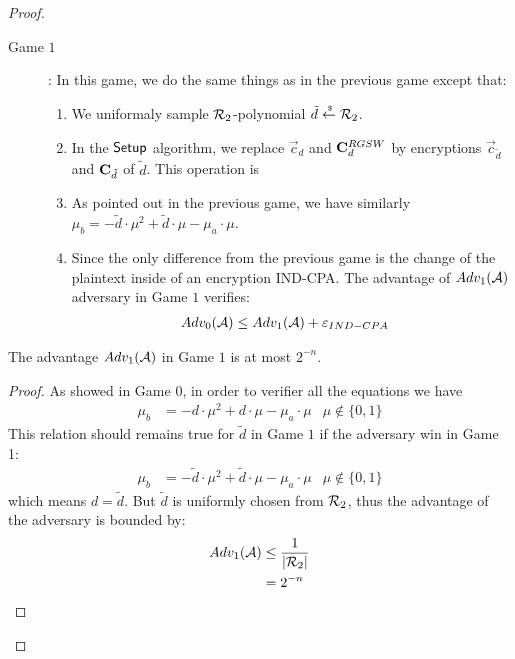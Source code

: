 \begin{proof}
\begin{description}
\begin{description}
    \item[\textsf{Game} $1$]: In this game, we do the same things as in the previous game except that:
      \begin{enumerate}
      \item We uniformaly sample ${\mathcal{R}}_2$-polynomial $\tilde{d} \stackrel{{\scriptscriptstyle \mkern4mu \$}}{\gets} {\mathcal{R}}_2$.
      \item In the ${\mathsf{Setup}}$ algorithm, we replace $\vec{c}_d$ and $\mathbf{C}_d^{RGSW}$ by encryptions $\vec{c}_{\tilde{d}}$ and $\mathbf{C}_{\tilde{d}}$ of $\tilde{d}$.
        This operation is
      \item As pointed out in the previous game, we have similarly $\mu_b = - \tilde{d} \cdot \mu^2 + \tilde{d} \cdot \mu - \mu_a \cdot \mu$.
      \item Since the only difference from the previous game is the change of the plaintext inside of an encryption IND-CPA.
        The advantage of $Adv_1(\mathcal{A})$ adversary in \textsf{Game} $1$ verifies:
        \begin{align*}
          Adv_0(\mathcal{A}) &\leq Adv_1(\mathcal{A}) + \varepsilon_{IND-CPA}
        \end{align*}
      \end{enumerate}
    \end{description}

    \begin{lemma}
      The advantage $Adv_1(\mathcal{A})$ in \textsf{Game} $1$ is at most $2^{-n}$.
    \end{lemma}
    \begin{proof}
      As showed in \textsf{Game} $0$, in order to verifier all the equations we have
      \begin{align*}
        \mu_b &= - d \cdot \mu^2 + d \cdot \mu - \mu_a \cdot \mu & \mu \not \in \{0,1\}
      \end{align*}
      This relation should remains true for $\tilde{d}$ in \textsf{Game} $1$ if the adversary win in \textsf{Game} 1:
      \begin{align*}
        \mu_b &= - \tilde{d} \cdot \mu^2 + \tilde{d} \cdot \mu - \mu_a \cdot \mu &\mu \not \in \{0,1\}
      \end{align*}
      which means $d = \tilde{d}$.
      But $\tilde{d}$ is uniformly chosen from ${\mathcal{R}}_2$, thus the advantage of the adversary is bounded by:
      \begin{align*}
        Adv_1(\mathcal{A}) &\leq \frac{1}{|{\mathcal{R}}_2|}\\
        &= 2^{-n}
      \end{align*}
      
    \end{proof}

    
  \end{description}

\end{proof}


